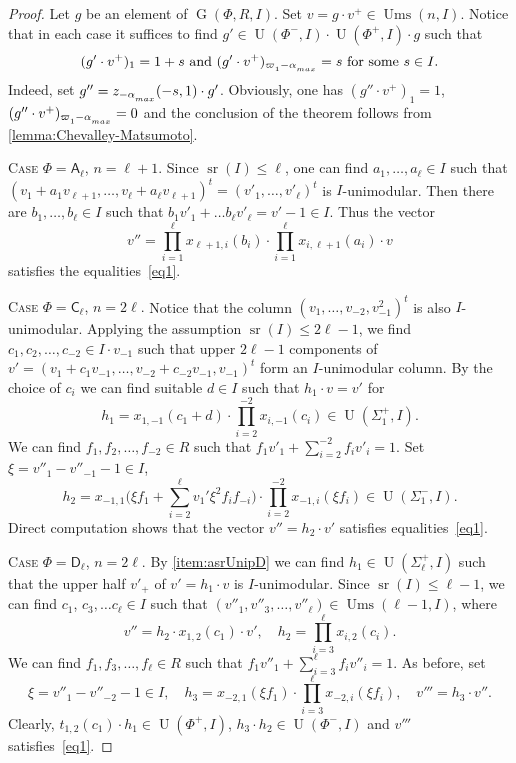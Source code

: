 \documentclass[11pt]{amsart}
\theoremstyle{plain}
\numberwithin{equation}{section}
\numberwithin{lemma}{section}
\theoremstyle{definition}
\theoremstyle{remark}
\DeclareMathOperator{\G}{G}
\DeclareMathOperator{\U}{U}
\DeclareMathOperator{\sr}{sr}
\DeclareMathOperator{\Ums}{Ums}
\newcommand{\rA}{\mathsf{A}}
\newcommand{\rC}{\mathsf{C}}
\newcommand{\rD}{\mathsf{D}}
\def\ssub#1{\mathchoice
   {_{\lower2pt\hbox{$\scriptstyle #1$}}}
   {_{\lower2pt\hbox{$\scriptstyle #1$}}}
   {_{\lower1.5pt\hbox{$\scriptscriptstyle #1$}}}
   {_{\!\lower1.5pt\hbox{$\scriptscriptstyle #1$}}}}
\begin{document}
\begin{proof}

Let $g$ be an element of $\G(\Phi, R, I)$. Set $v=g \cdot v^+\in\Ums(n, I)$. 
Notice that in each case it suffices to find $g' \in \U(\Phi^-, I) \cdot \U(\Phi^+, I) \cdot g$ such that 
\begin{equation} \label{eq1} (g'\cdot v^+)_{1} = 1 + s \text{ and } (g'\cdot v^+)_{\varpi\ssub{1}-\alpha\ssub{max}} = s\ \text{for some}\ s\in I. \end{equation}
Indeed, set $g'' = z_{-\alpha\ssub{max}}(-s, 1) \cdot g'$.
Obviously, one has $(g''\cdot v^+)_1 = 1$, $(g''\cdot v^+)_{\varpi\ssub{1}-\alpha\ssub{max}}=0$ and the conclusion of the theorem follows from \cref{lemma:Chevalley-Matsumoto}.

\textsc{Case $\Phi=\rA_\ell$, $n=\ell + 1$.}
Since $\sr(I)\leqslant\ell$, one can find $a_1, \ldots, a_\ell\in I$ such that $(v_1+a_1v_{\ell+1}, \ldots, v_\ell+a_\ell v_{\ell+1})^t=(v'_1, \ldots, v'_\ell)^t$ is $I$-unimodular.
Then there are $b_1, \ldots, b_\ell\in I$ such that $b_1v'_1+\ldots b_\ell v'_\ell=v'-1\in I$. 
Thus the vector \[ v'' = \prod_{i=1}^\ell x_{\ell+1, i}(b_i) \cdot \prod_{i=1}^\ell x_{i, \ell+1}(a_i) \cdot v \]
satisfies the equalities~\eqref{eq1}.

\textsc{Case $\Phi=\rC_\ell$, $n=2\ell$.}
Notice that the column $(v_1, \ldots, v_{-2}, v_{-1}^2)^t$ is also $I$-unimodular.
Applying the assumption $\sr(I)\leqslant 2\ell-1$, we find $c_1, c_2, \ldots, c_{-2} \in I \cdot v_{-1}$ such that upper $2\ell -1$ components of $v'=(v_1 + c_1 v_{-1}, \ldots, v_{-2} + c_{-2}v_{-1}, v_{-1})^t$ form an $I$-unimodular column.
By the choice of $c_i$ we can find suitable $d\in I$ such that $h_1 \cdot v = v'$ for
\[ h_1 = x_{1, -1}(c_1 + d) \cdot \prod_{i=2}^{-2} x_{i, -1}(c_i) \in \U(\Sigma_1^+, I). \]
We can find $f_1, f_2, \ldots, f_{-2} \in R$ such that $f_1v'_1+\sum_{i=2}^{-2} f_i v'_i = 1$.
Set $\xi = v''_1-v''_{-1}-1 \in I$, 
\[ h_2 = x_{-1, 1}\biggl(\xi f_1 + \sum_{i=2}^\ell v_1' \xi^2 f_i f_{-i}\biggr) \cdot \prod_{i=2}^{-2} x_{-1, i}(\xi f_i) \in \U(\Sigma_1^-, I). \]
Direct computation shows that the vector $v'' = h_2 \cdot v'$ satisfies equalities~\eqref{eq1}.

\textsc{Case $\Phi=\rD_\ell$, $n= 2\ell$.} 
By \cref{item:asrUnipD} we can find $h_1\in \U(\Sigma^+_\ell, I)$ such that the upper half $v'_+$ of $v'=h_1 \cdot v$ is $I$-unimodular.
Since $\sr(I)\leqslant \ell-1$, we can find $c_1$, $c_3, \ldots c_\ell \in I$ such that $(v''_1, v''_3, \ldots, v''_\ell) \in \Ums(\ell-1, I)$, where
\[ v''=h_2 \cdot x_{1, 2}(c_1) \cdot v', \quad h_2=\prod_{i=3}^\ell x_{i, 2}(c_i). \]
We can find $f_1, f_3, \ldots, f_\ell \in R$ such that $f_1v''_1+\sum_{i=3}^\ell f_i v''_{i} = 1$.
As before, set
\[ \xi = v''_1-v''_{-2}-1 \in I, \quad h_3 = x_{-2, 1}(\xi f_1) \cdot \prod_{i=3}^\ell x_{-2, i}(\xi f_i), \quad v'''=h_3 \cdot v''. \]
Clearly, $t_{1, 2}(c_1) \cdot h_1 \in \U(\Phi^+, I)$, $ h_3 \cdot h_2 \in \U(\Phi^-, I)$ and $v'''$ satisfies~\eqref{eq1}.


\end{proof}
\end{document}

